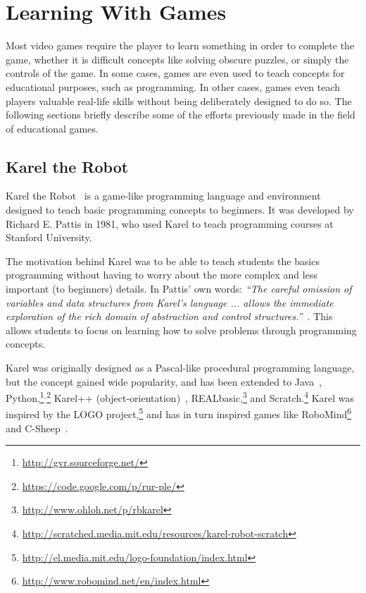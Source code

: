 \section{Learning With Games}
\label{sec:learning_with_games}
Most video games require the player to learn something in order to complete the game, whether it is difficult concepts like solving obscure puzzles, or simply the controls of the game. In some cases, games are even used to teach concepts for educational purposes, such as programming. In other cases, games even teach players valuable real-life skills without being deliberately designed to do so. The following sections briefly describe some of the efforts previously made in the field of educational games.

\subsection{Karel the Robot}
\label{sec:karel_the_robot}
Karel the Robot~\cite{pattis:karel_the_robot} is a game-like programming language and environment designed to teach basic programming concepts to beginners. It was developed by Richard E. Pattis in 1981, who used Karel to teach programming courses at Stanford University.

\noindent
The motivation behind Karel was to be able to teach students the basics programming without having to worry about the more complex and less important (to beginners) details. In Pattis' own words: \emph{``The careful omission of variables and data structures from Karel's language ... allows the immediate exploration of the rich domain of abstraction and control structures.''}~\cite{pattis:karel_the_robot}. This allows students to focus on learning how to solve problems through programming concepts.

\noindent
Karel was originally designed as a Pascal-like procedural programming language, but the concept gained wide popularity, and has been extended to Java~\cite{roberts:karel_the_robot_java},
Python,\footnote{\url{http://gvr.sourceforge.net/}}$^{,}$\footnote{\url{https://code.google.com/p/rur-ple/}} Karel++ (object-orientation)~\cite{bergin:karel_plus_plus}, REALbasic,\footnote{\url{http://www.ohloh.net/p/rbkarel}} and Scratch.\footnote{\url{http://scratched.media.mit.edu/resources/karel-robot-scratch}} Karel was inspired by the LOGO project,\footnote{\url{http://el.media.mit.edu/logo-foundation/index.html}} and has in turn inspired games like RoboMind\footnote{\url{http://www.robomind.net/en/index.html}} and C-Sheep~\cite{anderson:c-sheep}.

